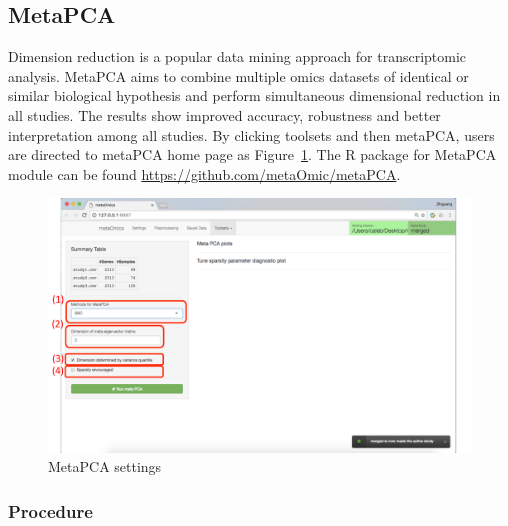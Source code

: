 \subsection{MetaPCA}
Dimension reduction is a popular data mining approach for transcriptomic analysis.
MetaPCA aims to combine multiple omics datasets of identical or similar biological hypothesis and perform simultaneous dimensional reduction in all studies.
The results show improved accuracy, robustness and better interpretation among all studies.
By clicking toolsets and then metaPCA,
users are directed to metaPCA home page as Figure~\ref{fig:metaPCAHome}.
The R package for MetaPCA module can be found \url{https://github.com/metaOmic/metaPCA}.

\begin{figure}[H]
\begin{center}
\includegraphics[scale=0.5]{./figure/metaPCA/metaPCAHome}
\caption{MetaPCA settings}
\label{fig:metaPCAHome}
\end{center}
\end{figure}

\subsubsection{Procedure}

